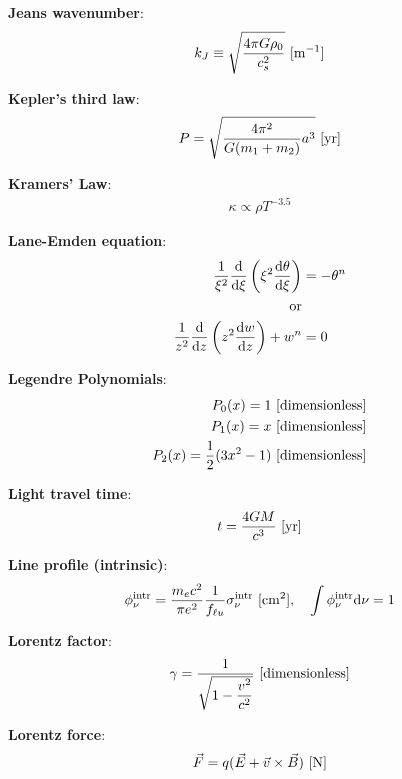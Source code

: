 \documentclass[a4paper,10pt]{article}
\begin{document}
{\noindent}\textbf{Jeans wavenumber}:
\begin{align*}
    k_J \equiv \sqrt{\frac{4\pi G\rho_0}{c_s^2}} ~ [{\rm m^{-1}}]
\end{align*}

{\noindent}\textbf{Kepler's third law}:
\begin{align*}
    P = \sqrt{\frac{4\pi^2}{G(m_1+m_2)}a^3} ~ [{\rm yr}]
\end{align*}

{\noindent}\textbf{Kramers' Law}:
\begin{align*}
    \kappa \propto \rho T^{-3.5}
\end{align*}

{\noindent}\textbf{Lane-Emden equation}:
\begin{align*}
    \frac{1}{\xi^2}\frac{{\rm d}}{{\rm d}\xi} \left(\xi^2\frac{{\rm d}\theta}{{\rm d}\xi}\right) &= -\theta^n \\
    {\rm or} \\
    \frac{1}{z^2}\frac{{\rm d}}{{\rm d}z} \left(z^2 \frac{{\rm d}w}{{\rm d}z}\right) + w^n &= 0
\end{align*}

{\noindent}\textbf{Legendre Polynomials}:
\begin{align*}
    P_0(x) = 1 ~ [{\rm dimensionless}] \\
    P_1(x) = x ~ [{\rm dimensionless}] \\
    P_2(x) = \frac{1}{2}(3x^2-1) ~ [{\rm dimensionless}]
\end{align*}

{\noindent}\textbf{Light travel time}:
\begin{align*}
    t = \frac{4GM}{c^3} ~ [{\rm yr}]
\end{align*}

{\noindent}\textbf{Line profile (intrinsic)}:
\begin{align*}
     \phi_\nu^{\rm intr} = \frac{m_ec^2}{\pi e^2}\frac{1}{f_{\ell u}} \sigma_\nu^{\rm intr} ~ [{\rm cm^2}], ~~~ \int\phi_\nu^{\rm intr}{\rm d}\nu =1
\end{align*}

{\noindent}\textbf{Lorentz factor}:
\begin{align*}
    \gamma = \frac{1}{\sqrt{1-\dfrac{v^2}{c^2}}} ~ [{\rm dimensionless}]
\end{align*}

{\noindent}\textbf{Lorentz force}:
\begin{align*}
    \vec{F} = q(\vec{E}+\vec{v}\times\vec{B}) ~ [{\rm N}]
\end{align*}
\end{document}

